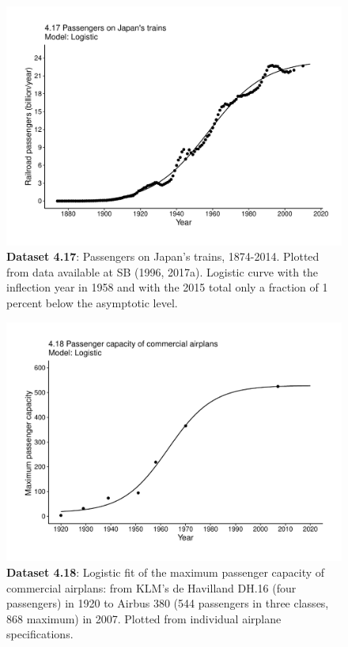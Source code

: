 \documentclass[aps,rmp,preprint,superscriptaddress,10pt,onecolumn]{article}
\begin{document}
\clearpage
\begin{figure}[h]
\includegraphics[width=\textwidth]{output/figs-ggplot/4.17.pdf}
\caption{\textbf{Dataset 4.17}: Passengers on Japan's trains, 1874-2014. Plotted from data available at SB (1996, 2017a). Logistic curve with the inflection year in 1958 and with the 2015 total only a fraction of 1 percent below the asymptotic level.}
\end{figure}
	
\clearpage
\begin{figure}[h]
\includegraphics[width=\textwidth]{output/figs-ggplot/4.18.pdf}
\caption{\textbf{Dataset 4.18}: Logistic fit of the maximum passenger capacity of commercial airplans: from KLM's de Havilland DH.16 (four passengers) in 1920 to Airbus 380 (544 passengers in three classes, 868 maximum) in 2007. Plotted from individual airplane specifications.}
\end{figure}
	
\end{document}
